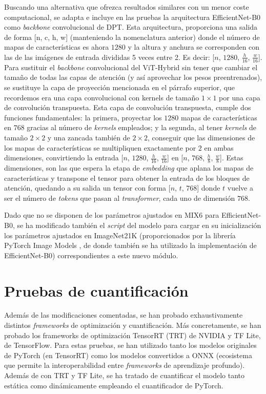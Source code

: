 Buscando una alternativa que ofrezca resultados similares con un menor coste computacional, se adapta e incluye en las pruebas la arquitectura EfficientNet-B0 como \textit{backbone} convolucional de DPT. Esta arquitectura, proporciona una salida de forma [n, c, h, w] (manteniendo la nomenclatura anterior) donde el número de mapas de características es ahora $1280$ y la altura y anchura se corresponden con las de las imágenes de entrada divididas 5 veces entre 2. Es decir: [$n$, $1280$, $\frac{h}{16}$, $\frac{w}{16}$]. Para sustituir el \textit{backbone} convolucional del ViT-Hybrid sin tener que cambiar el tamaño de todas las capas de atención (y así aprovechar los pesos preentrenados), se sustituye la capa de proyección mencionada en el párrafo superior, que recordemos era una capa convolucional con kernels de tamaño $1\times1$ por una capa de convolución transpuesta. Esta capa de convolución transpuesta, cumple dos funciones fundamentales: la primera, proyectar los $1280$ mapas de características en $768$ gracias al número de \textit{kernels} empleados; y la segunda, al tener \textit{kernels} de tamaño $2\times2$ y una zancada también de $2\times2$, conseguir que las dimensiones de los mapas de características se multipliquen exactamente por $2$ en ambas dimensiones, convirtiendo la entrada [$n$, $1280$, $\frac{h}{16}$, $\frac{w}{16}$] en [$n$, $768$, $\frac{h}{8}$, $\frac{w}{8}$]. Estas dimensiones, son las que espera la etapa de \textit{embedding} que aplana los mapas de características y transpone el tensor para obtener la entrada de los bloques de atención, quedando a su salida un tensor con forma [$n$, $t$, $768$] donde $t$ vuelve a ser el número de \textit{tokens} que pasan al \textit{transformer}, cada uno de dimensión $768$.

Dado que no se disponen de los parámetros ajustados en MIX6 para EfficientNet-B0, se ha modificado también el \textit{script} del modelo para cargar en su inicialización los parámetros ajustados en ImageNet21K (proporcionados por la librería PyTorch Image Models \cite{timm}, de donde también se ha utilizado la implementación de EfficientNet-B0) correspondientes a este nuevo módulo. 

\section{Pruebas de cuantificación}
Además de las modificaciones comentadas, se han probado exhaustivamente distintos \textit{frameworks} de optimización y cuantificación. Más concretamente, se han probado los frameworks de optimización TensorRT (TRT) de NVIDIA y TF Lite, de TensorFlow. Para estas pruebas, se han utilizado tanto los modelos originales de PyTorch (en TensorRT) como los modelos convertidos a ONNX (ecosistema que permite la interoperabilidad entre \textit{frameworks} de aprendizaje profundo). Además de con TRT y TF Lite, se ha tratado de cuantificar el modelo tanto estática como dinámicamente empleando el cuantificador de PyTorch.

